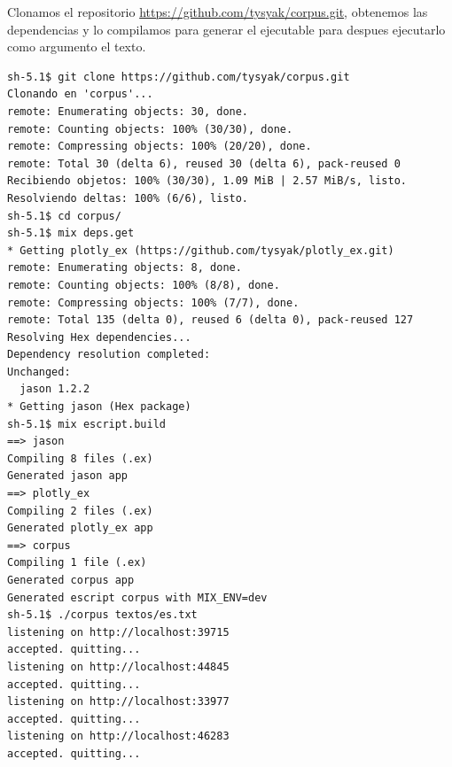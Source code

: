 \documentclass{IEEEtran}
\begin{document}
Clonamos el repositorio \url{https://github.com/tysyak/corpus.git}, obtenemos las
dependencias y lo compilamos para generar el ejecutable para despues
ejecutarlo como argumento el texto.
\begin{verbatim}
sh-5.1$ git clone https://github.com/tysyak/corpus.git
Clonando en 'corpus'...
remote: Enumerating objects: 30, done.
remote: Counting objects: 100% (30/30), done.
remote: Compressing objects: 100% (20/20), done.
remote: Total 30 (delta 6), reused 30 (delta 6), pack-reused 0
Recibiendo objetos: 100% (30/30), 1.09 MiB | 2.57 MiB/s, listo.
Resolviendo deltas: 100% (6/6), listo.
sh-5.1$ cd corpus/
sh-5.1$ mix deps.get
* Getting plotly_ex (https://github.com/tysyak/plotly_ex.git)
remote: Enumerating objects: 8, done.
remote: Counting objects: 100% (8/8), done.
remote: Compressing objects: 100% (7/7), done.
remote: Total 135 (delta 0), reused 6 (delta 0), pack-reused 127
Resolving Hex dependencies...
Dependency resolution completed:
Unchanged:
  jason 1.2.2
* Getting jason (Hex package)
sh-5.1$ mix escript.build
==> jason
Compiling 8 files (.ex)
Generated jason app
==> plotly_ex
Compiling 2 files (.ex)
Generated plotly_ex app
==> corpus
Compiling 1 file (.ex)
Generated corpus app
Generated escript corpus with MIX_ENV=dev
sh-5.1$ ./corpus textos/es.txt
listening on http://localhost:39715
accepted. quitting...
listening on http://localhost:44845
accepted. quitting...
listening on http://localhost:33977
accepted. quitting...
listening on http://localhost:46283
accepted. quitting...
\end{verbatim}
\end{document}
